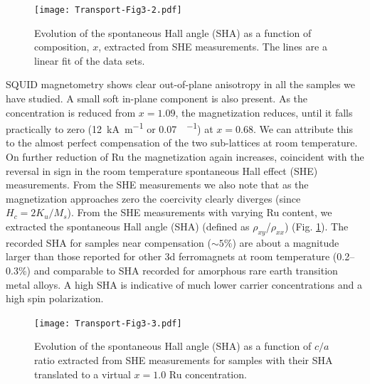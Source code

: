 \documentclass[reprint,aip,apl,floatfix,linenumbers,superscriptaddress]{revtex4-1}
\begin{document}
\begin{figure}
\texttt{[image: Transport-Fig3-2.pdf]}
\caption{Evolution of the spontaneous Hall angle (SHA) as a function of  composition, $x$, extracted from SHE measurements. The lines are a 
linear fit of the data sets.}
\label{fig:SHAvx}
\end{figure}


SQUID magnetometry shows clear out-of-plane anisotropy in all the samples we 
have studied.  A small soft in-plane component is also 
present. As the  concentration is reduced from $x=\num{1.09}$, 
the magnetization reduces, until it falls practically to zero (\SI{12}{
\kilo\ampere\per\metre} or \SI{0.07}{\BohrMagneton\per\formulaunit}) at $x=
\num{0.68}$. 
We can attribute this to the almost perfect compensation of the two  
sub-lattices at room temperature. On further reduction of Ru the 
magnetization again increases, coincident with the reversal in sign in the 
room temperature spontaneous Hall effect (SHE) measurements. From the SHE 
measurements we also note that as the magnetization approaches zero the 
coercivity clearly diverges (since $H_c=2K_u/M_s$).
From the SHE measurements with varying Ru content, we extracted the 
spontaneous Hall angle (SHA) (defined as $\rho_{xy}$/$\rho_{xx}$) (Fig. \ref{fig:SHAvx}).  
The recorded SHA for samples near compensation ($\sim \num{5}\%$) are about a 
magnitude larger than those reported for other 3d ferromagnets at room 
temperature (\numrange{0.2}{0.3}\%)\cite{dorleijn1976} and comparable to SHA 
recorded for amorphous rare earth transition metal alloys\cite{Kim2001}. A 
high SHA is indicative of much lower carrier concentrations and a high spin 
polarization.

\begin{figure}
\texttt{[image: Transport-Fig3-3.pdf]}
\caption{Evolution of the spontaneous Hall angle (SHA) as a function of $c/a$ 
ratio extracted from SHE measurements for samples with their SHA translated 
to a virtual $x=1.0$ Ru concentration.}
\label{fig:SHAvca}
\end{figure}
\end{document}
